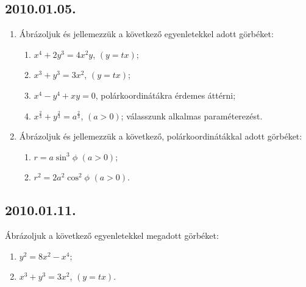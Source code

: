 \documentclass{article}
\begin{document}
\subsection*{2010.01.05.}
\begin{enumerate}
\item Ábrázoljuk és jellemezzük a következő egyenletekkel adott görbéket:
\begin{enumerate}
\item $x^4+2y^3=4x^2y$, $(y=tx)$;
\item $x^3+y^3=3x^2$, $(y=tx)$;
\item $x^4-y^4+xy=0$, polárkoordinátákra érdemes áttérni;
\item $x^{\frac{2}{3}}+y^{\frac{2}{3}}=a^{\frac{2}{3}}$, $(a>0)$; válasszunk alkalmas paraméterezést.
\end{enumerate}
\item Ábrázoljuk és jellemezzük a következő, polárkoordinátákkal adott görbéket:
\begin{enumerate}
\item $r=a\sin^3\phi$ $(a>0)$;
\item $r^2=2a^2\cos^2\phi$ $(a>0)$.
\end{enumerate}
\end{enumerate}

\subsection*{2010.01.11.}
Ábrázoljuk a következő egyenletekkel megadott görbéket:
\begin{enumerate}
\item $y^2=8x^2-x^4$;
\item $x^3+y^3=3x^2$, $(y=tx)$.
\end{enumerate}
\end{document}
